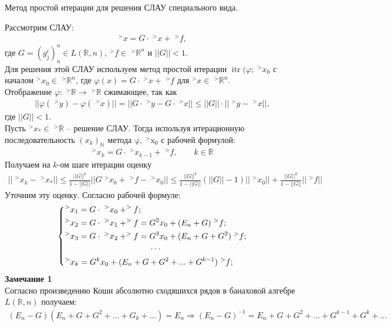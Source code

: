\documentclass[__main__.tex]{subfiles}
\begin{document}
Метод простой итерации для решения СЛАУ специального вида.


Рассмотрим СЛАУ:
\begin{gather*}
^>x=G\cdot \;^>x+\;^>f,
\end{gather*}
где $G=(g^i_j)^n_n \in L(\mathbb R, n)$, $^>f \in \;^>\mathbb R^n$ и $||G||<1$.\\
Для решения этой СЛАУ используем метод простой итерации $\operatorname{itr}(\varphi; \;^>x_0$ с началом $^>x_0\in \;^>\mathbb R^n$, где $\varphi(x)=G\cdot \;^>x+\;^>f$ для $^>x \in \;^> \mathbb R^n$. \\
Отображение $\varphi: \;^>\mathbb R \rightarrow \;^>\mathbb R$ сжимающее, так как 
\begin{gather*}
||\varphi(\;^>y)-\varphi(\;^>x)||=||G\cdot \;^>y -G\cdot \;^>x|| \leqslant ||G||\cdot ||\;^>y-\;^>x||, 
\end{gather*}
где $||G||<1$.\\
Пусть $^>x_*\in \;^>\mathbb R$ -- решение СЛАУ. Тогда используя итерационную последовательность $(x_k)_{\mathbb N}$ метода $\operatorname{\varphi, \;^>x_0}$ с рабочей формулой:
\begin{gather*}
^>x_k=G\cdot \;^>x_{k-1}+\;^>f, \qquad k\in \mathbb R
\end{gather*}
Получаем на $k$-ом шаге итерации оценку
\begin{gather*}
||\;^>x_k-\;^>x_*||\leqslant \frac{||G||^k}{1-||G||}||G\;^>x_0+\;^>f-\;^>x_0||\leqslant \frac{||G||^k}{1-||G||}(||G||-1)||\;^>x_0||+\frac{||G||^k}{1-||G||}||\;^>f||
\end{gather*}
Уточним эту оценку. Согласно рабочей формуле:
\begin{gather*}
\left\{
	\begin{gathered}
	^>x_1=G\cdot\;^>x_0+^>f; \hfill \\
	^>x_2=G\cdot\;^>x_1+^>f=G^2x_0+(E_n+G)\;^>f; \hfill \\
	^>x_3=G\cdot\;^>x_2+^>f=G^3x_0+(E_n+G+G^2)\;^>f; \hfill \\
	\cdots \\
	^>x_k=G^kx_0+(E_n+G+G^2+...+G^{k-1})\;^>f; \hfill \\
	\end{gathered}
\right.
\end{gather*}
\textbf{Замечание 1}\\
Согласно произведению Коши абсолютно сходяшихся рядов в банаховой алгебре $L(\mathbb R, n)$ получаем:
\begin{gather*}
(E_n-G)(E_n+G+G^2+...+G_k+...)=E_n \Longrightarrow (E_n-G)^{-1}=E_n+G+G^2+...+G^{k-1}+G^k+...
\end{gather*}
\end{document}
